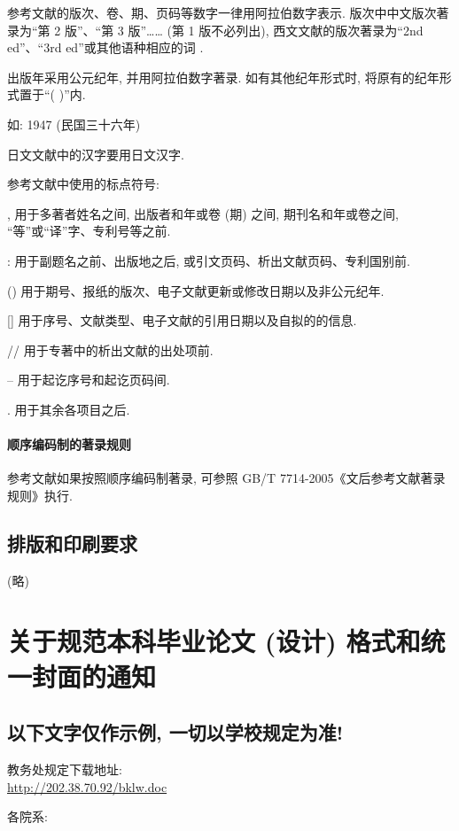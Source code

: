 参考文献的版次、卷、期、页码等数字一律用阿拉伯数字表示. 版次中中文版次著录为“第 2 版”、“第 3 版”…… (第 1 版不必列出), 西文文献的版次著录为“2nd ed”、“3rd ed”或其他语种相应的词 .

出版年采用公元纪年, 并用阿拉伯数字著录. 如有其他纪年形式时, 将原有的纪年形式置于“( )”内.

如: 1947 (民国三十六年)

日文文献中的汉字要用日文汉字.

参考文献中使用的标点符号:

, 用于多著者姓名之间, 出版者和年或卷 (期) 之间, 期刊名和年或卷之间, “等”或“译”字、专利号等之前.

: 用于副题名之前、出版地之后, 或引文页码、析出文献页码、专利国别前.

() 用于期号、报纸的版次、电子文献更新或修改日期以及非公元纪年.

[] 用于序号、文献类型、电子文献的引用日期以及自拟的的信息.

// 用于专著中的析出文献的出处项前.

-- 用于起讫序号和起讫页码间.

. 用于其余各项目之后.

\subsubsection{顺序编码制的著录规则}

参考文献如果按照顺序编码制著录, 可参照 GB/T 7714-2005《文后参考文献著录规则》执行.

\section{排版和印刷要求}

(略)

\chapter{关于规范本科毕业论文 (设计) 格式和统一封面的通知}
\section*{以下文字仅作示例, 一切以学校规定为准!}
教务处规定下载地址:\\
\url{http://202.38.70.92/bklw.doc}

\bigskip

\noindent 各院系:

